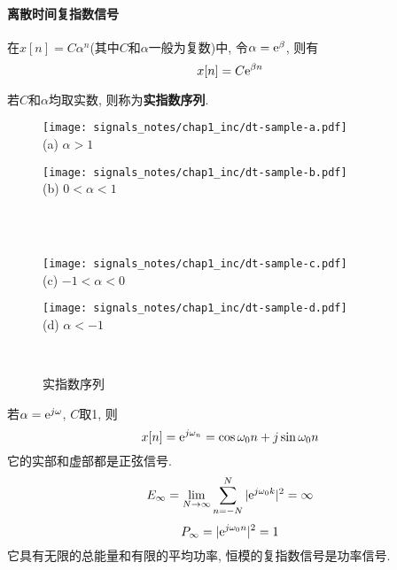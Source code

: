            \paragraph{离散时间复指数信号}

                在$x[n]=C\alpha ^n$(其中$C$和$\alpha $一般为复数)中, 令$\alpha =\mathrm{e}^\beta $, 则有
                \[x[n]=C\mathrm{e}^{\beta n}\]

                若$C$和$\alpha$均取实数, 则称为\textbf{实指数序列}.

                \begin{figure}[h]\centering
                    \begin{minipage}{0.4\linewidth}\centering
                        \texttt{[image: signals\_notes/chap1\_inc/dt-sample-a.pdf]}\\
                        (a) $\alpha>1$
                    \end{minipage}
                    \begin{minipage}{0.4\linewidth}\centering
                        \texttt{[image: signals\_notes/chap1\_inc/dt-sample-b.pdf]}\\
                        (b) $0<\alpha<1$
                    \end{minipage}\\\
                    \begin{minipage}{0.4\linewidth}\centering
                        \texttt{[image: signals\_notes/chap1\_inc/dt-sample-c.pdf]}\\
                        (c) $-1<\alpha<0$
                    \end{minipage}
                    \begin{minipage}{0.4\linewidth}\centering
                        \texttt{[image: signals\_notes/chap1\_inc/dt-sample-d.pdf]}\\
                        (d) $\alpha<-1$
                    \end{minipage}\\
                    \caption{实指数序列}
                    \label{fig:2:dt-comp-singals}
                \end{figure}

                若$\alpha=\mathrm{e}^{j\omega}$, $C$取1, 则
                \[x[n]=\mathrm{e}^{j\omega_n}=\cos\omega_0n+j\sin\omega_0n\]
                它的实部和虚部都是正弦信号. 
                \[E_\infty=\lim_{N\to\infty}\sum_{n=-N}^N|\mathrm{e}^{j\omega_0k}|^2=\infty\]
                \[P_\infty=|\mathrm{e}^{j\omega_0n}|^2=1\]
                它具有无限的总能量和有限的平均功率, 恒模的复指数信号是功率信号.

